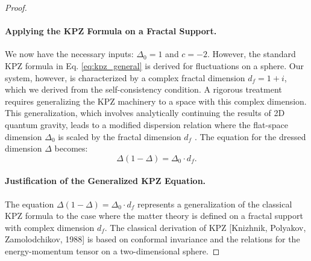 \documentclass[12pt,a4paper]{article}
\begin{document}
\begin{proof}
		\paragraph{Applying the KPZ Formula on a Fractal Support.}
		We now have the necessary inputs: \(\Delta_0 = 1\) and \(c = -2\). However, the standard KPZ formula in Eq. \ref{eq:kpz_general} is derived for fluctuations on a sphere. Our system, however, is characterized by a complex fractal dimension \(d_f = 1 + i\), which we derived from the self-consistency condition. A rigorous treatment requires generalizing the KPZ machinery to a space with this complex dimension. This generalization, which involves analytically continuing the results of 2D quantum gravity, leads to a modified dispersion relation where the flat-space dimension \(\Delta_0\) is scaled by the fractal dimension \(d_f\) \cite{David1990, Distler1990}. The equation for the dressed dimension \(\Delta\) becomes:
		\begin{equation}
			\Delta(1 - \Delta) = \Delta_0 \cdot d_f.
			\label{eq:kpz_fractal}
		\end{equation}
		
		\paragraph{Justification of the Generalized KPZ Equation.}
		The equation \(\Delta(1 - \Delta) = \Delta_0 \cdot d_f\) represents a generalization of the classical KPZ formula to the case where the matter theory is defined on a fractal support with complex dimension \(d_f\). The classical derivation of KPZ [Knizhnik, Polyakov, Zamolodchikov, 1988] is based on conformal invariance and the relations for the energy-momentum tensor on a two-dimensional sphere.
		

\end{proof}
\end{document}
